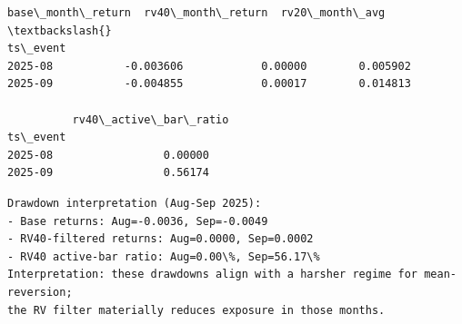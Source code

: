 \documentclass[11pt]{article}
\begin{document}
    
    \begin{Verbatim}[commandchars=\\\{\}]
          base\_month\_return  rv40\_month\_return  rv20\_month\_avg  \textbackslash{}
ts\_event                                                         
2025-08           -0.003606            0.00000        0.005902   
2025-09           -0.004855            0.00017        0.014813   

          rv40\_active\_bar\_ratio  
ts\_event                         
2025-08                 0.00000  
2025-09                 0.56174  
    \end{Verbatim}

    
    \begin{Verbatim}[commandchars=\\\{\}]
Drawdown interpretation (Aug-Sep 2025):
- Base returns: Aug=-0.0036, Sep=-0.0049
- RV40-filtered returns: Aug=0.0000, Sep=0.0002
- RV40 active-bar ratio: Aug=0.00\%, Sep=56.17\%
Interpretation: these drawdowns align with a harsher regime for mean-reversion;
the RV filter materially reduces exposure in those months.
    \end{Verbatim}
\end{document}
